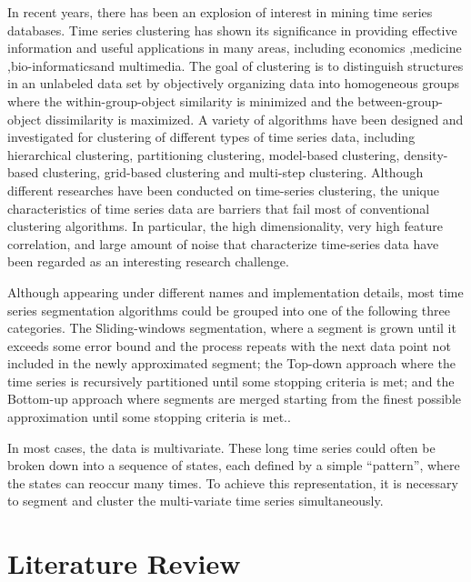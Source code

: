 \documentclass{llncs}
\begin{document}
In recent years, there has been an explosion of interest in mining time series databases. Time series clustering has shown its significance in providing effective information and useful applications in many areas, including economics \cite{DEMETRIADES1996387},medicine \cite{DBLP:conf/smc/TsujinoO10},bio-informatics\cite{DBLP:journals/bmcbi/WangJLZWWHZJXW17}and multimedia\cite{DBLP:conf/mue/NiennattrakulR07}. The goal of clustering is to distinguish structures in an unlabeled data set by objectively organizing data into homogeneous groups where the within-group-object similarity is minimized and the between-group-object dissimilarity is maximized\cite{DBLP:journals/pr/Liao05}. A variety of algorithms have been designed and investigated for clustering of different types of time series data, including hierarchical clustering, partitioning clustering, model-based clustering, density-based clustering, grid-based clustering and multi-step clustering. Although different researches have been conducted on time-series clustering, the unique characteristics of time series data are barriers that fail most of conventional clustering algorithms. In particular, the high dimensionality, very high feature correlation, and large amount of noise that characterize time-series data have been regarded as an interesting research challenge\cite{DBLP:journals/is/AghabozorgiST15}.

Although appearing under different names and implementation details, most time series segmentation algorithms could be grouped into one of the following three categories. The Sliding-windows segmentation, where a segment is grown until it exceeds some error bound and the process repeats with the next data point not included in the newly approximated segment; the Top-down approach where the time series is recursively partitioned until some stopping criteria is met; and the Bottom-up approach where segments are merged starting from the finest possible approximation until some stopping criteria is met.\cite{segTS}.

In most cases, the data is multivariate. These long time series could often be broken down into a sequence of states, each defined by a simple “pattern”, where the states can reoccur many times\cite{tiic}. To achieve this representation, it is necessary to segment and cluster the multi-variate time series simultaneously. 


\section{Literature Review}
\end{document}
